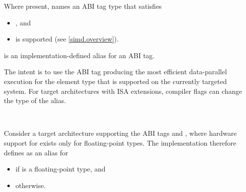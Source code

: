 \pnum
Where present,  names an ABI tag type that satisfies
\begin{itemize}
  \item {}, and
  \item {} is supported (see \ref{simd.overview}).
\end{itemize}



\pnum
{} is an implementation-defined alias for an ABI tag.
\begin{note}
The intent is to use the ABI tag producing the most efficient data-parallel
execution for the element type  that is supported on the currently
targeted system.
For target architectures with ISA extensions, compiler flags can change the
type of the  alias.
\end{note}\\
\begin{example}
  Consider a target architecture supporting the ABI tags
   and , where hardware support for
   exists only for floating-point types.
  The implementation therefore defines  as an alias for
  \begin{itemize}
    \item {} if  is a floating-point type, and
    \item {} otherwise.
  \end{itemize}
\end{example}

